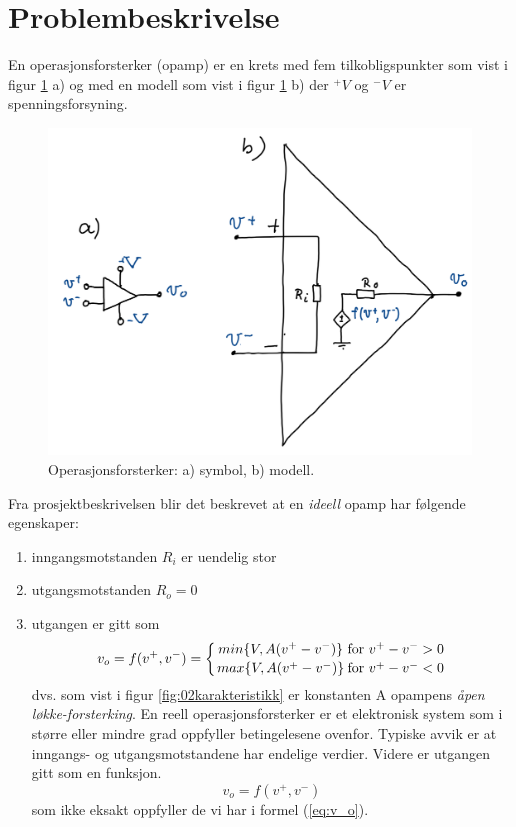 \section{Problembeskrivelse}
\label{sec:issue}

En operasjonsforsterker (opamp) er en krets med fem tilkobligspunkter som vist i figur \ref{fig:01opamp} a)  og med en modell som vist i figur \ref{fig:01opamp} b) der $^+V$ og $^-V $ er spenningsforsyning.

\begin{figure}[H]
	\centering
	\includegraphics[scale=0.5]{./Images/01Issue/01_opamp.png}
	\caption{Operasjonsforsterker: a) symbol, b) modell.}
	\label{fig:01opamp}
\end{figure}

Fra prosjektbeskrivelsen \cite{ntnu_2022_ttt426065} blir det beskrevet at en \textit{ideell} opamp har følgende egenskaper:
\begin{enumerate}
    \item inngangsmotstanden $R_i$ er uendelig stor
    \item utgangsmotstanden $R_o = 0$
    \item utgangen er gitt som \newline \begin{equation} v_o=f(v^+,v^-) = \biggl\{ {{min\{V,A(v^+-v^-)\}} \atop {max\{V,A(v^+-v^-)\}}} {{\text{for } v^+-v^->0}\atop{\text{for } v^+-v^-<0}} \label{eq:v_o} \end{equation} \newline dvs. som vist i figur \ref{fig:02karakteristikk} er konstanten A opampens \textit{åpen løkke-forsterking}. En reell operasjonsforsterker er et elektronisk system som i større eller mindre grad oppfyller betingelesene ovenfor. Typiske avvik er at inngangs- og utgangsmotstandene har endelige verdier. Videre er utgangen gitt som en funksjon. \newline \begin{equation} v_o=f(v^+,v^-) \end{equation} \newline som ikke eksakt oppfyller de vi har i formel (\ref{eq:v_o}).
\end{enumerate}

